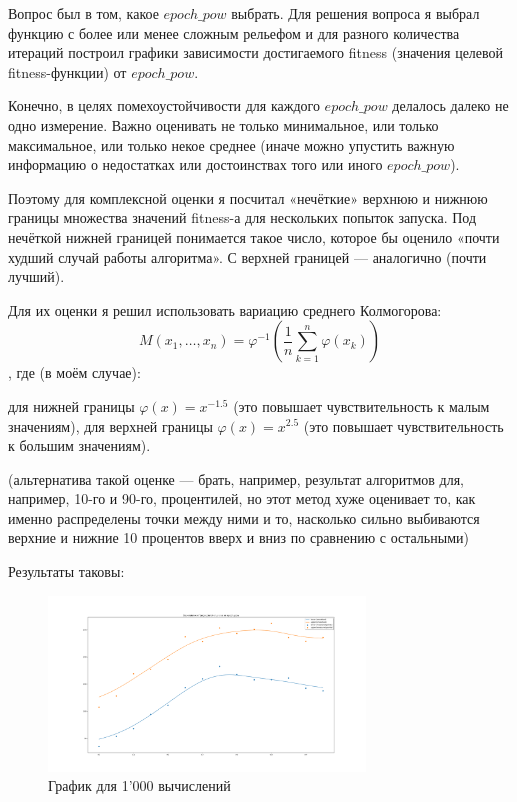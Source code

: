 \documentclass[11pt]{article}
\begin{document}
    Вопрос был в том, какое $epoch\_pow$ выбрать.
    Для решения вопроса я выбрал функцию с более или менее сложным рельефом и для разного количества итераций
    построил графики зависимости достигаемого fitness (значения целевой fitness-функции) от $epoch\_pow$.

    Конечно, в целях помехоустойчивости для каждого $epoch\_pow$ делалось далеко не одно измерение.
    Важно оценивать не только минимальное, или только максимальное, или только некое среднее (иначе можно упустить важную информацию
    о недостатках или достоинствах того или иного $epoch\_pow$).

    Поэтому для комплексной оценки я посчитал «нечёткие» верхнюю и нижнюю границы множества значений fitness-а для нескольких попыток запуска.
    Под нечёткой нижней границей понимается такое число, которое бы оценило «почти худший случай работы алгоритма».
    С верхней границей — аналогично (почти лучший).

    Для их оценки я решил использовать вариацию среднего Колмогорова:
    \begin{equation}
        M(x_{1},\ldots ,x_{n})=\varphi ^{-1}\left({\frac {1}{n}}\sum _{k=1}^{n}\varphi (x_{k})\right)
    \end{equation}
    , где (в моём случае):

    для нижней границы $\varphi(x) = x^{-1.5}$ (это повышает чувствительность к малым значениям),
    для верхней границы $\varphi(x) = x^{2.5}$ (это повышает чувствительность к большим значениям).

    (альтернатива такой оценке — брать, например, результат алгоритмов для, например, 10-го и 90-го, процентилей,
    но этот метод хуже оценивает то, как именно распределены точки между ними и то,
    насколько сильно выбиваются верхние и нижние 10 процентов вверх и вниз по сравнению с остальными)

    Результаты таковы:
    \begin{figure}[h]
        \centering
        \includegraphics[width=0.75\textwidth]{exploring_optimal_epoch_pow_1000_iterations.png}
        \caption{График для 1'000 вычислений}
        \label{fig:epoch-pow-1000}
    \end{figure}
    \FloatBarrier
\end{document}
